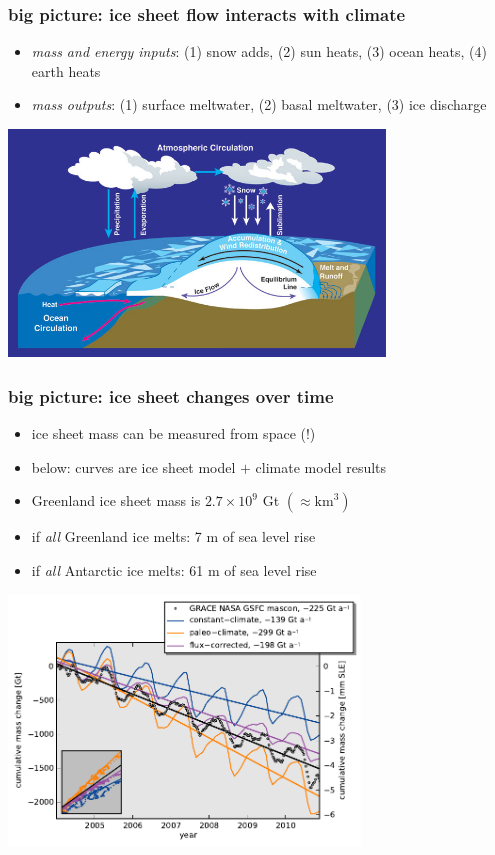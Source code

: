 \documentclass{beamer}
\begin{document}
\begin{frame}
  \frametitle{big picture: ice sheet flow interacts with climate}

\medskip
\small
\begin{itemize}
\item \emph{mass and energy inputs}: (1) snow adds, (2) sun heats, (3) ocean heats, (4) earth heats
\item \emph{mass outputs}: (1) surface meltwater, (2) basal meltwater, (3) ice discharge
\end{itemize}

\begin{center}
  \includegraphics[width=0.75\textwidth]{mass-bal-atmos}
\end{center}
\end{frame}


\begin{frame}
  \frametitle{big picture: ice sheet changes over time}

\small
\begin{itemize}
\item ice sheet mass can be measured from space (!)
\item below: curves are ice sheet model $+$ climate model results
\item  Greenland ice sheet mass is $2.7 \times 10^9$ Gt \quad $(\approx \text{km}^3)$ %
\item  if \emph{all} Greenland ice melts: 7 m of sea level rise
\item  if \emph{all} Antarctic ice melts: 61 m of sea level rise
\end{itemize}
\normalsize

\begin{center}
    \includegraphics[width=0.7\textwidth]{ts_mass_2004-2010}
\end{center}
\end{frame}
\end{document}
